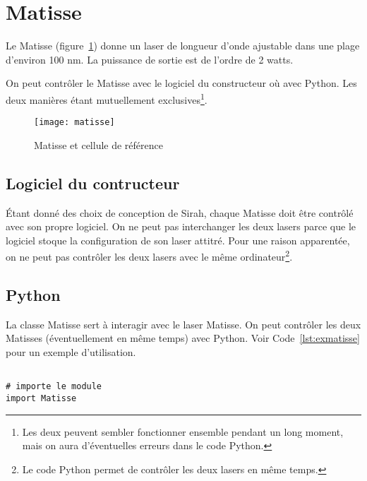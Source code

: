 \documentclass[11pt,francais]{book} %
\begin{document}

\section{Matisse}

Le Matisse (figure~\ref{fig:matisse}) donne un laser de longueur d'onde ajustable dans une plage d'environ 100 nm.
La puissance de sortie est de l'ordre de 2 watts.

On peut contrôler le Matisse avec le logiciel du constructeur où avec Python.
Les deux manières étant mutuellement exclusives\footnote{Les deux peuvent sembler fonctionner ensemble pendant un long moment, mais on aura d'éventuelles erreurs dans le code Python.}.

\begin{figure}[h]
  \centering\texttt{[image: matisse]}
  \caption{Matisse et cellule de référence}
  \label{fig:matisse}
\end{figure}

\subsection{Logiciel du contructeur}

Étant donné des choix de conception de Sirah, chaque Matisse doit être contrôlé avec son propre logiciel.
On ne peut pas interchanger les deux lasers parce que le logiciel stoque la configuration de son laser attitré.
Pour une raison apparentée, on ne peut pas contrôler les deux lasers avec le même ordinateur\footnote{Le code Python permet de contrôler les deux lasers en même temps.}.

\subsection{Python}

La classe Matisse sert à interagir avec le laser Matisse.
On peut contrôler les deux Matisses (éventuellement en même temps) avec Python.
Voir Code~\ref{lst:exmatisse} pour un exemple d'utilisation.

\begin{lstlisting}[frame=single,caption={Exemple d'utilisation du Matisse avec Python},label={lst:exmatisse},breaklines=true,]  % Start your code-block

# importe le module
import Matisse

\end{lstlisting}
\end{document}
